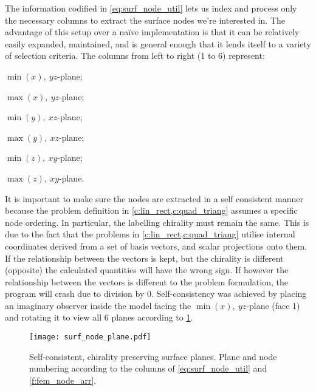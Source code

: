 		The information codified in \cref{eq:surf_node_util} lets us index and process only the necessary columns to extract the surface nodes we're interested in. The advantage of this setup over a naïve implementation is that it can be relatively easily expanded, maintained, and is general enough that it lends itself to a variety of selection criteria. The columns from left to right (1 to 6) represent: 
		\begin{inparaenum}
			\item $ \min(x),~ yz $-plane;
			\item $ \max(x),~ yz $-plane;
			\item $ \min(y),~ xz $-plane;
			\item $ \max(y),~ xz $-plane;
			\item $ \min(z),~ xy $-plane;
			\item $ \max(z),~ xy $-plane.
		\end{inparaenum} 
		
		It is important to make sure the nodes are extracted in a self consistent manner because the problem definition in \cref{c:lin_rect,c:quad_triang} assumes a specific node ordering. In particular, the labelling chirality must remain the same. This is due to the fact that the problems in \cref{c:lin_rect,c:quad_triang} utilise internal coordinates derived from a set of basis vectors, and scalar projections onto them. If the relationship between the vectors is kept, but the chirality is different (opposite) the calculated quantities will have the wrong sign. If however the relationship between the vectors is different to the problem formulation, the program will crash due to division by 0. Self-consistency was achieved by placing an imaginary observer inside the  model facing the $ \min(x),~ yz $-plane (face 1) and rotating it to view all 6 planes according to \cref{f:surf_node_plane}.
		\begin{figure}
			\centering
			\texttt{[image: surf\_node\_plane.pdf]}
			\caption[Self-consistent, chirality preserving surface planes.]{Self-consistent, chirality preserving surface planes. Plane and node numbering according to the columns of \cref{eq:surf_node_util} and \cref{f:fem_node_arr}.}
			\label{f:surf_node_plane}
		\end{figure}
		
		